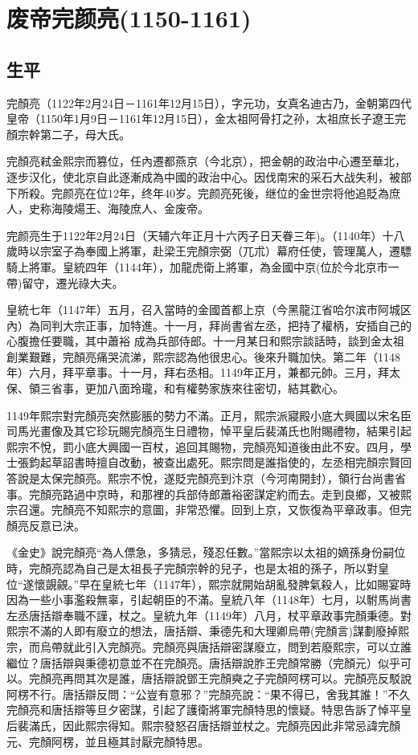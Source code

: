 
\section{废帝完颜亮\tiny(1150-1161)}

\subsection{生平}

完顏亮（1122年2月24日－1161年12月15日），字元功，女真名迪古乃，金朝第四代皇帝（1150年1月9日－1161年12月15日），金太祖阿骨打之孙，太祖庶长子遼王完顏宗幹第二子，母大氏。

完顏亮弒金熙宗而篡位，任內遷都燕京（今北京），把金朝的政治中心遷至華北，逐步汉化，使北京自此逐漸成為中國的政治中心。因伐南宋的采石大战失利，被部下所殺。完颜亮在位12年，终年40岁。完颜亮死後，继位的金世宗将他追貶為庶人，史称海陵煬王、海陵庶人、金废帝。

完颜亮生于1122年2月24日（天辅六年正月十六丙子日天眷三年)。（1140年）十八歲時以宗室子為奉國上將軍，赴梁王完顏宗弼（兀朮）幕府任使，管理萬人，遷驃騎上將軍。皇統四年（1144年），加龍虎衛上將軍，為金國中京(位於今北京市一帶)留守，遷光祿大夫。

皇統七年（1147年）五月，召入當時的金國首都上京（今黑龍江省哈尔滨市阿城区內）為同判大宗正事，加特進。十一月，拜尚書省左丞，把持了權柄，安插自己的心腹擔任要職，其中蕭裕 成為兵部侍郎。十一月某日和熙宗談話時，談到金太祖創業艱難，完顏亮痛哭流涕，熙宗認為他很忠心。後來升職加快。第二年（1148年）六月，拜平章事。十一月，拜右丞相。1149年正月，兼都元帥。三月，拜太保、領三省事，更加八面玲瓏，和有權勢家族來往密切，結其歡心。

1149年熙宗對完顏亮突然膨脹的勢力不滿。正月，熙宗派寢殿小底大興國以宋名臣司馬光畫像及其它珍玩賜完顏亮生日禮物，悼平皇后裴滿氏也附賜禮物，結果引起熙宗不悅，罰小底大興國一百杖，追回其賜物，完顏亮知道後由此不安。四月，學士張鈞起草詔書時擅自改動，被查出處死。熙宗問是誰指使的，左丞相完顏宗賢回答說是太保完顏亮。熙宗不悅，遂貶完顏亮到汴京（今河南開封），領行台尚書省事。完顏亮路過中京時，和那裡的兵部侍郎蕭裕密謀定約而去。走到良鄉，又被熙宗召還。完顏亮不知熙宗的意圖，非常恐懼。回到上京，又恢復為平章政事。但完顏亮反意已決。

《金史》說完顏亮“為人僄急，多猜忌，殘忍任數。”當熙宗以太祖的嫡孫身份嗣位時，完顏亮認為自己是太祖長子完顏宗幹的兒子，也是太祖的孫子，所以對皇位“遂懷覬覦。”早在皇統七年（1147年），熙宗就開始胡亂發脾氣殺人，比如賜宴時因為一些小事濫殺無辜，引起朝臣的不滿。皇統八年（1148年）七月，以駙馬尚書左丞唐括辯奉職不謹，杖之。皇統九年（1149年）八月，杖平章政事完顏秉德。對熙宗不滿的人即有廢立的想法，唐括辯、秉德先和大理卿烏帶(完顏言)謀劃廢掉熙宗，而烏帶就此引入完顏亮。完顏亮與唐括辯密謀廢立，問到若廢熙宗，可以立誰繼位？唐括辯與秉德初意並不在完顏亮。唐括辯說胙王完顏常勝（完顏元）似乎可以。完顏亮再問其次是誰，唐括辯說鄧王完顏奭之子完顏阿楞可以。完顏亮反駁說阿楞不行。唐括辯反問：“公豈有意邪？”完顏亮說：“果不得已，舍我其誰！”不久完顏亮和唐括辯等旦夕密謀，引起了護衛將軍完顏特思的懷疑。特思告訴了悼平皇后裴滿氏，因此熙宗得知。熙宗發怒召唐括辯並杖之。完顏亮因此非常忌諱完顏元、完顏阿楞，並且極其討厭完顏特思。

